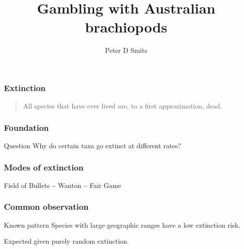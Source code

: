\documentclass{beamer}
\title{Gambling with Australian brachiopods}
\author{Peter D Smits}
\institute{Committee on Evolutionary Biology, University of Chicago}
\begin{document}
\begin{frame}
  \maketitle
\end{frame}

\begin{frame}
  \frametitle{Extinction}

  \begin{quotation}
    All species that have ever lived are, to a first approximation, dead.

    \tiny{}
  \end{quotation}
\end{frame}

\begin{frame}
  \frametitle{Foundation}

  \begin{alertblock}{Question}
    Why do certain taxa go extinct at different rates?
  \end{alertblock}
\end{frame}

\begin{frame}
  \frametitle{Modes of extinction}

   Field of Bullets 
   \textbf{--} 
   Wanton 
   \textbf{--} 
   Fair Game 

  \bigskip

  \tiny{}
\end{frame}

\begin{frame}
  \frametitle{Common observation}

  \begin{block}{Known pattern}
    Species with large geographic ranges have a low extinction risk.
  \end{block}

  \bigskip

  \begin{center}
    Expected given \alert{purely random} extinction.
  \end{center}
\end{frame}
\end{document}
